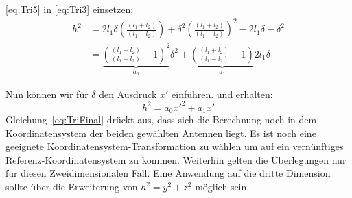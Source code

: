\eqref{eq:Tri5} in \eqref{eq:Tri3} einsetzen:
\begin{align}
	h^2 &= 2l_1\delta\left(\frac{(l_1 + l_2)}{(l_1 - l_2)}\right) + \delta^2\left(\frac{(l_1 + l_2)}{(l_1 - l_2)}\right)^2 - 2l_1 \delta - \delta^2 \nonumber \\
	&= \underbrace{\left(\frac{(l_1 + l_2)}{(l_1 - l_2)} - 1 \right)^2}_\text{$a_0$} \delta^2 + \underbrace{\left(\frac{(l_1 + l_2)}{(l_1 - l_2)}  - 1 \right)}_\text{$a_1$} 2l_1\delta
\end{align}

Nun können wir für $\delta$ den Ausdruck $x'$ einführen. und erhalten:
\begin{equation}
	h^2 = a_0 x'^2 + a_1 x' \label{eq:TriFinal}
\end{equation}
%
Gleichung~\eqref{eq:TriFinal} drückt aus, dass sich die Berechnung noch in dem Koordinatensystem der beiden gewählten Antennen liegt. Es ist noch eine geeignete Koordinatensystem-Transformation zu wählen um auf ein vernünftiges Referenz-Koordinatensystem zu kommen.
Weiterhin gelten die Überlegungen nur für diesen Zweidimensionalen Fall. Eine Anwendung auf die dritte Dimension sollte über die Erweiterung von $h^2 = y^2+z^2$ möglich sein.
